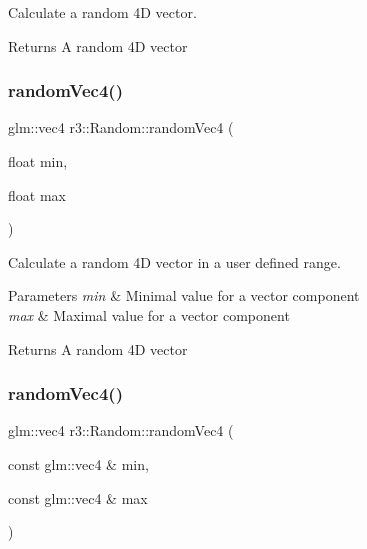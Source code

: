 Calculate a random 4D vector. 

\begin{DoxyReturn}{Returns}
A random 4D vector 
\end{DoxyReturn}
\mbox{\label{classr3_1_1_random_aec123971a394e6b064d00e7abb61d2a1}} 
\subsubsection{\texorpdfstring{random\+Vec4()}{randomVec4()}\hspace{0.1cm}{\footnotesize\ttfamily [2/3]}}
{\footnotesize\ttfamily glm\+::vec4 r3\+::\+Random\+::random\+Vec4 (\begin{DoxyParamCaption}\item[{float}]{min,  }\item[{float}]{max }\end{DoxyParamCaption})\hspace{0.3cm}{\ttfamily [static]}}



Calculate a random 4D vector in a user defined range. 


\begin{DoxyParams}{Parameters}
{\em min} & Minimal value for a vector component \\
\hline
{\em max} & Maximal value for a vector component \\
\hline
\end{DoxyParams}
\begin{DoxyReturn}{Returns}
A random 4D vector 
\end{DoxyReturn}
\mbox{\label{classr3_1_1_random_a69cce589274029051cc7568dd8fde54d}} 
\subsubsection{\texorpdfstring{random\+Vec4()}{randomVec4()}\hspace{0.1cm}{\footnotesize\ttfamily [3/3]}}
{\footnotesize\ttfamily glm\+::vec4 r3\+::\+Random\+::random\+Vec4 (\begin{DoxyParamCaption}\item[{const glm\+::vec4 \&}]{min,  }\item[{const glm\+::vec4 \&}]{max }\end{DoxyParamCaption})\hspace{0.3cm}{\ttfamily [static]}}




